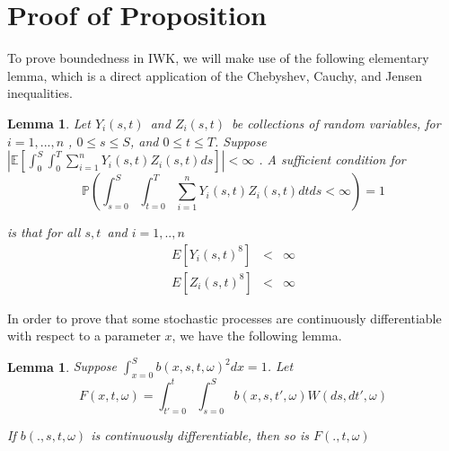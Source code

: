 \documentclass{article}
\newtheorem{lemma}[theorem]{Lemma}
\begin{document}
\appendix

\section{Proof of Proposition}

To prove boundedness in IWK, we will make use of the following elementary
lemma, which is a direct application of the Chebyshev, Cauchy, and Jensen
inequalities.


\begin{lemma}
\label{lemma::finite_eighth_moment} \textit{Let }$Y_{i}(s,t)$\textit{\ and }$%
Z_{i}(s,t)$\textit{\ be collections of random variables, for }$i=1,...,n$%
\textit{, }$0\leq s\leq S$\textit{, and }$0\leq t\leq T$\textit{. Suppose }$%
|\mathbb{E}[\int_{0}^{S}\int_{0}^{T}\sum_{i=1}^{n}Y_{i}(s,t)Z_{i}(s,t)ds]|<\infty $%
\textit{. A sufficient condition for }%
\begin{equation*}
\mathbb{P}\left(\int_{s=0}^{S}\int_{t=0}^{T}\sum_{i=1}^{n}Y_{i}(s,t)Z_{i}(s,t)dtds<\infty \right)=1
\end{equation*}

\textit{is that for all }$s,t$\textit{\ and }$i=1,..,n$%
\begin{eqnarray*}
E[Y_{i}(s,t)^{8}] &<&\infty \\
E[Z_{i}(s,t)^{8}] &<&\infty
\end{eqnarray*}
\end{lemma}

In order to prove that some stochastic processes are continuously
differentiable with respect to a parameter $x$, we have the following lemma.

\bigskip


\begin{lemma}
\label{lemma::differentiable_F} Suppose $\int_{x=0}^{S}b(x,s,t,\omega )^{2}dx=1
$. Let
\begin{equation*}
F(x,t,\omega )=\int_{t'=0}^{t}\int_{s=0}^{S}b(x,s,t',\omega )W(ds,dt',\omega )
\end{equation*}

If $b(.,s,t,\omega )$ is continuously differentiable, then so is $%
F(.,t,\omega )$
\end{lemma}
\end{document}
